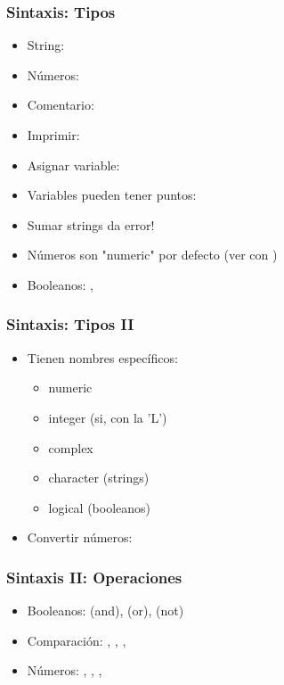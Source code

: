 \documentclass[14pt,aspectratio=169,xcolor=dvipsnames]{beamer}
\begin{document}
\begin{frame}[fragile]\frametitle{Sintaxis: Tipos}
    \begin{itemize}
        \item String: 
        \item Números: 
        \item Comentario: 
        \item Imprimir: 
        \item Asignar variable: 
        \item Variables pueden tener puntos: 
        \item Sumar strings da error!
                
            \begin{flushright} \end{flushright}
        \item Números son "numeric" por defecto (ver con )
        \item Booleanos: ,
    \end{itemize}
\end{frame}
\begin{frame}\frametitle{Sintaxis: Tipos II}
    \begin{itemize}
        \item Tienen nombres específicos:
            \begin{itemize}
                \item numeric 
                \item integer   (si, con la 'L')
                \item complex 
                \item character  (strings)
                \item logical   (booleanos)
            \end{itemize}
        \item Convertir números: 
    \end{itemize}
\end{frame}
\begin{frame}\frametitle{Sintaxis II: Operaciones}
    \begin{itemize}
        \item Booleanos:  (and),  (or),  (not)
        \item Comparación: , , , 
        \item Números: , , , 
    \end{itemize}
\end{frame}
\end{document}
